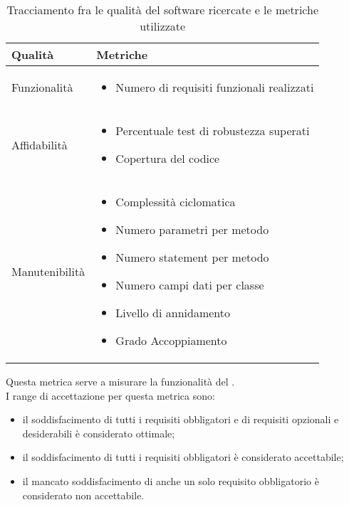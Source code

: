 			\begin{table}[H]
			\begin{center}
			\begin{tabular}{ | m{4cm} | m{8cm} | } 
			\hline
			\textbf{Qualità} & \textbf{Metriche} \\ \hline

                        Funzionalità & \begin{itemize} \item Numero di requisiti funzionali realizzati \end{itemize} \\ \hline
                        Affidabilità & \begin{itemize}
                                 \item Percentuale test di robustezza superati
                                 \item Copertura del codice
                                \end{itemize} \\ \hline
                        Manutenibilità     & \begin{itemize}
                                    \item Complessità ciclomatica
                                    \item Numero parametri per metodo
                                    \item Numero statement per metodo
                                    \item Numero campi dati per classe
                                    \item Livello di annidamento
                                    \item Grado Accoppiamento
                                  \end{itemize}\\ \hline 
			\end{tabular}
			\end{center}
			\caption{Tracciamento fra le qualità del software ricercate e le metriche utilizzate}
			\end{table}
					Questa metrica serve a misurare la funzionalità del . \\
					I range di accettazione per questa metrica sono:
					\begin{itemize}
					\item il soddisfacimento di tutti i requisiti obbligatori e di requisiti opzionali e desiderabili è considerato ottimale;
					\item il soddisfacimento di tutti i requisiti obbligatori è considerato accettabile;
					\item il mancato soddisfacimento di anche un solo requisito obbligatorio è considerato non accettabile.
					\end{itemize}
